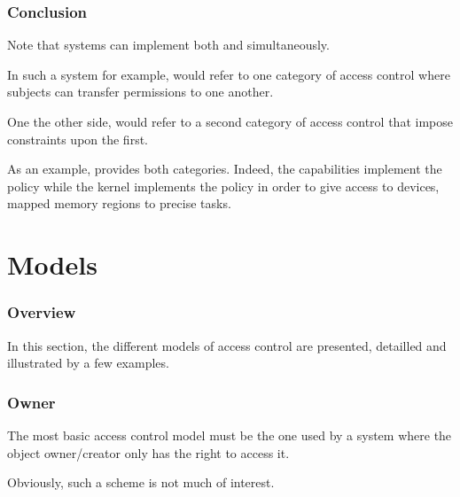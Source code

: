 \begin{frame}
  \frametitle{Conclusion}

  Note that systems can implement both  and 
  simultaneously.

  \-

  In such a system for example,  would refer to one category of
  access control where subjects can transfer permissions to one another.

  \-

  One the other side,  would refer to a second category of access
  control that impose constraints upon the first.

  \-

  As an example,  provides both categories. Indeed, the
  capabilities implement the  policy while the kernel implements
  the  policy in order to give access to devices, mapped memory
  regions \etc{} to precise tasks.
\end{frame}

%
%

\section{Models}


\begin{frame}
  \frametitle{Overview}

  In this section, the different models of access control are presented,
  detailled and illustrated by a few examples.
\end{frame}


\begin{frame}
  \frametitle{Owner}

  The most basic access control model must be the one used by a system where
  the object owner/creator only has the right to access it.

  \-

  Obviously, such a scheme is not much of interest.
\end{frame}


